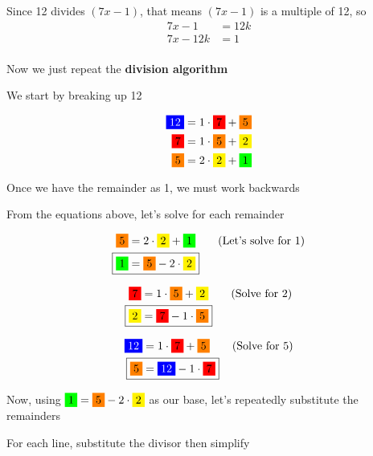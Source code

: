 \documentclass[../../Main.tex]{subfiles}
\begin{document}
\begin{example}
    Since 12 divides $(7x - 1)$, that means $(7x - 1)$ is a multiple of 12, so
    \begin{align*}
        7x - 1 &= 12k \\
        7x - 12k &= 1 \\
    \end{align*}

    Now we just repeat the \textbf{division algorithm}

    We start by breaking up 12

    \begin{align*}
        \bluebox{12} &= 1 \cdot \redbox{7} + \orangebox{5} \\ 
        \redbox{7} &= 1 \cdot \orangebox{5} + \yellowbox{2} \\
        \orangebox{5} &= 2 \cdot \yellowbox{2} + \greenbox{1}
    \end{align*}

    Once we have the remainder as 1, we must work backwards

    From the equations above, let's solve for each remainder

    \begin{align*}
        \orangebox{5} &= 2 \cdot \yellowbox{2} + \greenbox{1} \tag{Let's solve for 1} \\
        \Aboxed{\greenbox{1} &= \orangebox{5} - 2 \cdot \yellowbox{2}}
    \end{align*}

    \begin{align*}
        \redbox{7} &= 1 \cdot \orangebox{5} + \yellowbox{2} \tag{Solve for 2} \\
        \Aboxed{\yellowbox{2} &= \redbox{7} - 1 \cdot \orangebox{5}} \\
    \end{align*}

    \begin{align*}
        \bluebox{12} &= 1 \cdot \redbox{7} + \orangebox{5} \tag{Solve for 5} \\
        \Aboxed{\orangebox{5} &= \bluebox{12} - 1 \cdot \redbox{7}} \\
    \end{align*}

    Now, using $\greenbox{1} = \orangebox{5} - 2 \cdot \yellowbox{2}$ as our base, let's repeatedly substitute the remainders

    For each line, substitute the divisor then simplify


\end{example}
\end{document}
